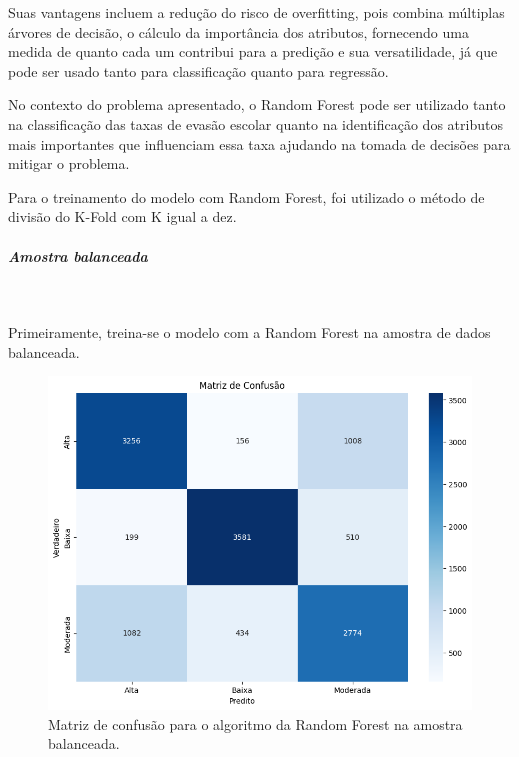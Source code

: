 \par Suas vantagens incluem a redução do risco de overfitting, pois combina múltiplas árvores de decisão, o cálculo da importância dos atributos, fornecendo uma medida de quanto cada um contribui para a predição e sua versatilidade, já que pode ser usado tanto para classificação quanto para regressão.

\par No contexto do problema apresentado, o Random Forest pode ser utilizado tanto na classificação das taxas de evasão escolar quanto na identificação dos atributos mais importantes que influenciam essa taxa ajudando na tomada de decisões para mitigar o problema.

\par Para o treinamento do modelo com Random Forest, foi utilizado o método de divisão do K-Fold com K igual a dez.

\subparagraph{Amostra balanceada} 

\

\par Primeiramente, treina-se o modelo com a Random Forest na amostra de dados balanceada.

\begin{figure}[H]
    \centering
    \includegraphics[scale = 0.4]{Graphics/Mat-Conf-Rand-Bal.png}
    \caption{Matriz de confusão para o algoritmo da Random Forest na amostra balanceada.}
    \label{fig:enter-label}
\end{figure}

